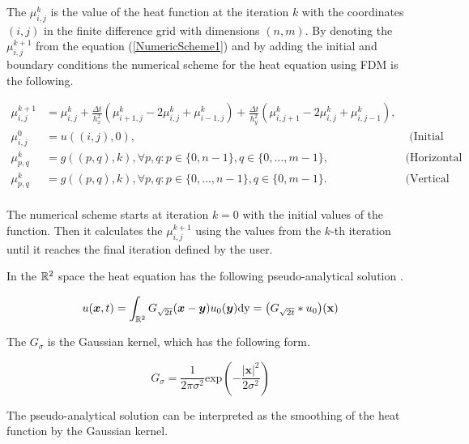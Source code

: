 The \(\mu_{i,j}^k\) is the value of the heat function at the iteration \(k\) with the coordinates \((i,j)\) in the finite difference grid with dimensions \((n,m)\).
By denoting the \(\mu_{i,j}^{k+1}\) from the equation (\ref{NumericScheme1}) and by adding the initial and boundary conditions the numerical scheme for the heat equation using FDM is the following.

\begin{equation}
\begin{aligned}
 \mu_{i,j}^{k+1} &= \mu_{i,j}^{k} + \frac{\Delta t}{h_x^2} (\mu^k_{i+1,j} - 2 \mu^k_{i,j} + \mu^k_{i-1,j}) + \frac{\Delta t}{h_y^2} (\mu^k_{i,j+1} - 2 \mu^k_{i,j} + \mu^k_{i,j-1}),& \\
 \mu_{i,j}^{0} &= u((i,j), 0), &\text{ (Initial condition)}\\
 \mu_{p,q}^k &= g((p,q), k), \forall p, q: p \in \{0, n-1\}, q \in \{0, \dots, m-1\}, &\text{(Horizontal boundaries)} \\
 \mu_{p,q}^k &= g((p,q), k), \forall p, q: p \in \{0, \dots, n-1\}, q \in \{0, m-1\}. &\text{(Vertical boundaries)}\\
\end{aligned}
\end{equation}

The numerical scheme starts at iteration \(k = 0\) with the initial values of the function.
Then it calculates the \(\mu^{k+1}_{i,j}\) using the values from the \(k\)-th iteration until it reaches the final iteration defined by the user.

In the \(\Bbb{R}^2\) space the heat equation has the following pseudo-analytical solution \cite{EvansPDE}.

\begin{equation} \label{GaussianKernel}
u(\boldsymbol x, t) = \int_{\Bbb{R}^2} G_{\sqrt{2t}}(\boldsymbol x - \boldsymbol y) u_0(\boldsymbol y) \text{dy} = \big(G_{\sqrt{2t}} * u_0\big)(\mathbf{x})
\end{equation}

The \(G_\sigma\) is the Gaussian kernel, which has the following form.

\begin{equation}
 G_\sigma = \frac{1}{2\pi\sigma^2}\text{exp}(-\frac{|\boldsymbol x|^2}{2\sigma^2})
\end{equation}

The pseudo-analytical solution can be interpreted as the smoothing of the heat function by the Gaussian kernel.
